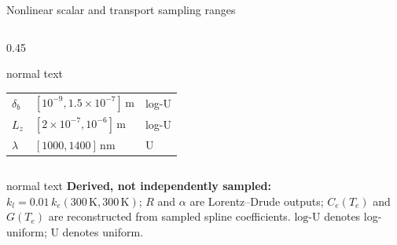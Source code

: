 \documentclass[aspectratio=169,10pt]{beamer}
\begin{document}
\begin{frame}[t]{Nonlinear scalar and transport sampling ranges}
\begin{columns}[T,totalwidth=0.94\textwidth]
\begin{column}{0.45\textwidth}
\begin{beamercolorbox}[wd=\linewidth,sep=0.45em]{normal text}
\begin{tabular}{@{}lll@{}}
          \(\delta_b\) & \([10^{-9},1.5\times10^{-7}]\,\mathrm{m}\) & log-U \\
          \(L_z\) & \([2\times10^{-7},10^{-6}]\,\mathrm{m}\) & log-U \\
          \(\lambda\) & \([1000,1400]\,\mathrm{nm}\) & U \\
        \end{tabular}
      \end{beamercolorbox}
    \end{column}
  \end{columns}
  \vspace{0.14cm}
  \begin{beamercolorbox}[wd=0.92\textwidth,sep=0.48em]{normal text}
    \scriptsize\textbf{\color{GVCapacityPurple}Derived, not independently sampled:}\quad
    \(k_l=0.01\,k_e(300\,\mathrm K,300\,\mathrm K)\); \(R\) and \(\alpha\) are Lorentz--Drude outputs; \(C_e(T_e)\) and \(G(T_e)\) are reconstructed from sampled spline coefficients. \(\mathrm{log\text{-}U}\) denotes log-uniform; \(\mathrm U\) denotes uniform.
  \end{beamercolorbox}
\end{frame}
\end{document}
